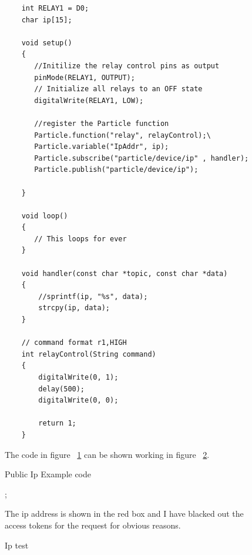 \documentclass{article}
\begin{document}
\begin{figure}[H]
    \begin{lstlisting}
    int RELAY1 = D0;
    char ip[15];

    void setup()
    {
       //Initilize the relay control pins as output
       pinMode(RELAY1, OUTPUT);
       // Initialize all relays to an OFF state
       digitalWrite(RELAY1, LOW);

       //register the Particle function
       Particle.function("relay", relayControl);\
       Particle.variable("IpAddr", ip);
       Particle.subscribe("particle/device/ip" , handler);
       Particle.publish("particle/device/ip");

    }

    void loop()
    {
       // This loops for ever
    }

    void handler(const char *topic, const char *data)
    {
        //sprintf(ip, "%s", data);
        strcpy(ip, data);
    }

    // command format r1,HIGH
    int relayControl(String command)
    {
        digitalWrite(0, 1);
        delay(500);
        digitalWrite(0, 0);

        return 1;
    }
    \end{lstlisting}
    \caption{Public Ip Example code} \label{fig:publicIpExample}
    \vspace{0.5cm}
    The code in figure ~\ref{fig:publicIpExample} can be shown working in figure ~\ref{fig:ipTest}.
\end{figure}


\begin{figure}[H]
    \noindent{};
    \caption{Ip test} \label{fig:ipTest}
    The ip address is shown in the red box and I have blacked out the access tokens for the request
    for obvious reasons.
\end{figure}
\end{document}
